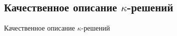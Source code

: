 \subsection{\texorpdfstring{Качественное описание $\kappa$-решений}{Качественное описание κ-решений}}
Качественное описание $\kappa$-решений